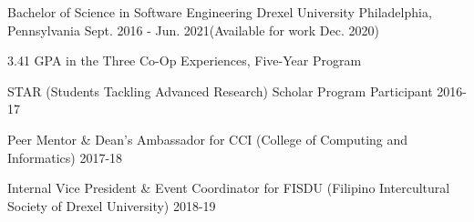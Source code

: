 

\begin{cventries}

  \cventry
    {Bachelor of Science in Software Engineering} %
    {Drexel University} %
    {Philadelphia, Pennsylvania} %
    {Sept. 2016 - Jun. 2021\linebreak(Available for work Dec. 2020)} %
    {
      \begin{cvitems} %
        \item 3.41 GPA in the Three Co-Op Experiences, Five-Year Program
        \item STAR (Students Tackling Advanced Research) Scholar Program Participant 2016-17
        \item Peer Mentor \& Dean's Ambassador for CCI (College of Computing and Informatics) 2017-18
        \item Internal Vice President \& Event Coordinator for FISDU (Filipino Intercultural Society of Drexel University) 2018-19
      \end{cvitems}
    }

\end{cventries}
